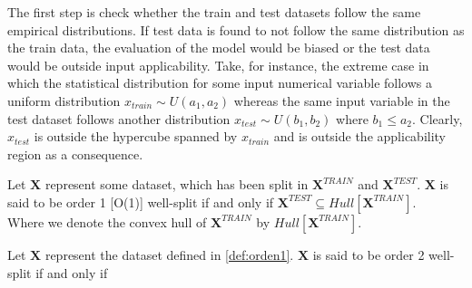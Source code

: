 

\indent The first step is check whether the train and test datasets follow the same empirical distributions. If test data is found to not follow the same distribution as the train data, the evaluation of the model would be biased or the test data would be outside input applicability. Take, for instance, the extreme case in which the statistical distribution for some input numerical variable follows a uniform distribution $x_{train} \sim U(a_1,a_2)$ whereas the same input variable in the test dataset follows another distribution $x_{test} \sim U(b_1,b_2)$ where $b_1 \leq a_2$. Clearly, $x_{test}$ is outside the hypercube spanned by $x_{train}$ and is outside the applicability region as a consequence.

\begin{definition}\label{def:orden1}
	Let $\mathbf{X}$ represent some dataset, which has been split in $\mathbf{X}^{TRAIN}$ and $\mathbf{X}^{TEST}$. $\mathbf{X}$ is said to be order 1 [O(1)] well-split if and only if $\mathbf{X}^{TEST} \subseteq Hull[\mathbf{X}^{TRAIN}]$.\\
	
	Where we denote the convex hull of $\mathbf{X}^{TRAIN}$ by $Hull[\mathbf{X}^{TRAIN}]$.
\end{definition}

\begin{definition}
	Let $\mathbf{X}$ represent the dataset defined in \autoref{def:orden1}. $\mathbf{X}$ is said to be order 2 well-split if and only if 
\end{definition}
%



\clearpage
